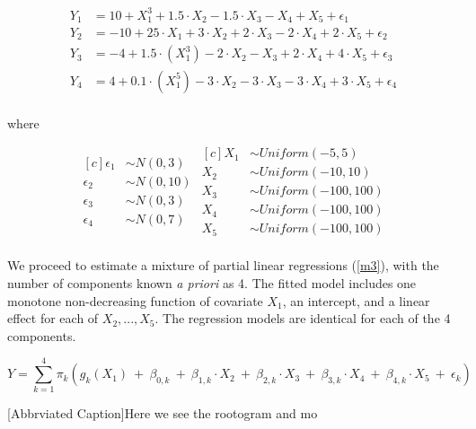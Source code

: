 \documentclass[fleqn,10pt]{olplainarticle}\usepackage[]{graphicx}\usepackage[]{color}
\begin{document}
\begin{align*}
  Y_{1} &= 10 + X_1^3 + 1.5\cdot X_2 - 1.5\cdot X_3 - X_4 + X_5 + \epsilon_1 \\
  Y_{2} &= -10 + 25 \cdot X_1 + 3\cdot X_2 + 2\cdot X_3 - 2\cdot X_4 + 2\cdot X_5 + \epsilon_2 \\
  Y_{3} &= -4 + 1.5 \cdot (X_1^3) - 2\cdot X_2 - X_3 + 2\cdot X_4 + 4\cdot X_5 + \epsilon_3 \\
  Y_{4} &= 4 + 0.1 \cdot (X_1^5) - 3\cdot X_2 - 3\cdot X_3 - 3\cdot X_4 + 3\cdot X_5 + \epsilon_4 \\
\end{align*}

where 

\begin{equation*}
\begin{aligned}[c]
  \epsilon_1 &\sim N(0,3) \\
  \epsilon_2 &\sim N(0,10) \\
  \epsilon_3 &\sim N(0,3) \\
  \epsilon_4 &\sim N(0,7) \\
\end{aligned}
\begin{aligned}[c]
  X_1 &\sim Uniform(-5,5) \\
  X_2 &\sim Uniform(-10,10) \\
  X_3 &\sim Uniform(-100,100) \\
  X_4 &\sim Uniform(-100,100) \\
  X_5 &\sim Uniform(-100,100) \\
\end{aligned}
\end{equation*}


We proceed to estimate a mixture of partial linear regressions (\ref{m3}), with the number of components known \emph{a priori} as 4. The fitted model includes one monotone non-decreasing function of covariate $X_1$, an intercept, and a linear effect for each of $X_2,...,X_5$. The regression models are identical for each of the 4 components.

\begin{equation} \label{m3}
  Y = \sum_{k=1}^{4}\pi_k (g_{k} (X_1) \ +\  \beta_{0,k} \ +\ \beta_{1,k}\cdot X_2 \ +\ \beta_{2,k}\cdot X_3 \ +\ \beta_{3,k}\cdot X_4 \ +\ \beta_{4,k}\cdot X_5 \ +\ \epsilon_k)
\end{equation}

\begin{minipage}{0.8\textwidth}

[Abbrviated Caption]{Here we see the rootogram and mo}
\end{minipage}
\end{document}
